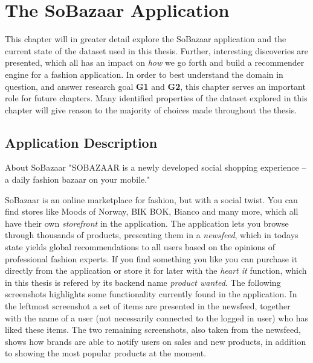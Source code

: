 
\chapter{The SoBazaar Application}
\label{chap:thesobazaardata}
\minitoc

This chapter will in greater detail explore the SoBazaar application and the
current state of the dataset used in this thesis. Further, interesting
discoveries are presented, which all has an impact on \textit{how} we go forth
and build a recommender engine for a fashion application. In order to best
understand the domain in question, and answer research goal \textbf{G1} and
\textbf{G2}, this chapter serves an important role for future chapters.  Many
identified properties of the dataset explored in this chapter will give reason
to the majority of choices made throughout the thesis.

\clearpage
\section{Application Description}
\label{sec:sobazaar-appication}


\begin{chapquote}[30pt]{About SoBazaar}
  "SOBAZAAR is a newly developed social shopping experience -- a daily fashion bazaar on your mobile."
\end{chapquote}

SoBazaar is an online marketplace for fashion, but with a social twist. You can
find stores like Moods of Norway, BIK BOK, Bianco and many more, which all have
their own \textit{storefront} in the application. The application lets you
browse through thousands of products, presenting them in a \textit{newsfeed},
which in todays state yields global recommendations to all users based on the
opinions of professional fashion experts. If you find something you like you
can purchase it directly from the application or store it for later with the
\emph{heart it} function, which in this thesis is refered by its backend name
\textit{product wanted}. The following screenshots highlights some
functionality currently found in the application. In the leftmost screenshot a
set of items are presented in the newsfeed, together with the name of a user
(not necessarily connected to the logged in user) who has liked these items.
The two remaining screenshots, also taken from the newsfeed, shows how brands
are able to notify users on sales and new products, in addition to showing the
most popular products at the moment.

